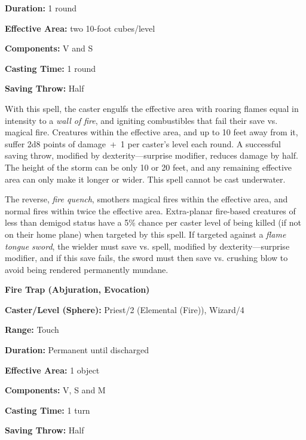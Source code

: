 \begin{multicols}{2}
\begin{minipage}{\columnwidth}
\noindent \textbf{Duration:} 1 round

\noindent \textbf{Effective Area:} two 10-foot cubes/level

\noindent \textbf{Components:} V and S

\noindent \textbf{Casting Time:} 1 round

\noindent \textbf{Saving Throw:} Half

\end{minipage}

With this spell, the caster engulfs the effective area with roaring flames equal in intensity to a \textit{wall of fire}, and igniting combustibles that fail their save vs. magical fire.  Creatures within the effective area, and up to 10 feet away from it, suffer 2d8 points of damage~+~1 per caster's level each round.  A successful saving throw, modified by dexterity---surprise modifier, reduces damage by half.  The height of the storm can be only 10 or 20 feet, and any remaining effective area can only make it longer or wider.  This spell cannot be cast underwater.

The reverse, \textit{fire quench}, smothers magical fires within the effective area, and normal fires within twice the effective area.  Extra-planar fire-based creatures of less than demigod status have a 5\% chance per caster level of being killed (if not on their home plane) when targeted by this spell.  If targeted against a \textit{flame tongue sword}, the wielder must save vs. spell, modified by dexterity---surprise modifier, and if this save fails, the sword must then save vs. crushing blow to avoid being rendered permanently mundane.

\vspace{1em}

\noindent
\begin{minipage}{\columnwidth}

\noindent \textbf{Fire Trap (Abjuration, Evocation)}

\noindent \textbf{Caster/Level (Sphere):} Priest/2 (Elemental (Fire)), Wizard/4

\noindent \textbf{Range:} Touch

\noindent \textbf{Duration:} Permanent until discharged

\noindent \textbf{Effective Area:} 1 object

\noindent \textbf{Components:} V, S and M

\noindent \textbf{Casting Time:} 1 turn

\noindent \textbf{Saving Throw:} Half


\end{minipage}
\end{multicols}
